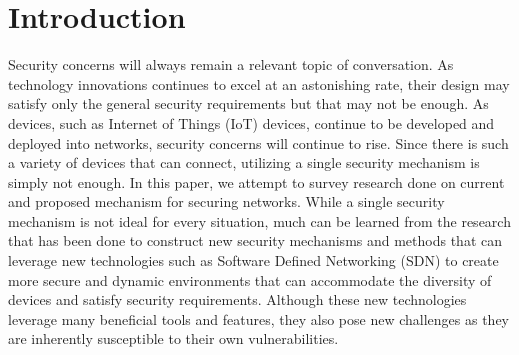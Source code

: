 \section {Introduction}

Security concerns will always remain a relevant topic of conversation. As technology innovations continues to excel at an astonishing rate, their design may satisfy only the general security requirements but that may not be enough. As devices, such as Internet of Things (IoT) devices, continue to be developed and deployed into networks, security concerns will continue to rise. Since there is such a variety of devices that can connect, utilizing a single security mechanism is simply not enough. In this paper, we attempt to survey research done on current and proposed mechanism for securing networks. While a single security mechanism is not ideal for every situation, much can be learned from the research that has been done to construct new security mechanisms and methods that can leverage new technologies such as Software Defined Networking (SDN) to create more secure and dynamic environments that can accommodate the diversity of devices and satisfy security requirements. Although these new technologies leverage many beneficial tools and features, they also pose new challenges as they are inherently susceptible to their own vulnerabilities. 
